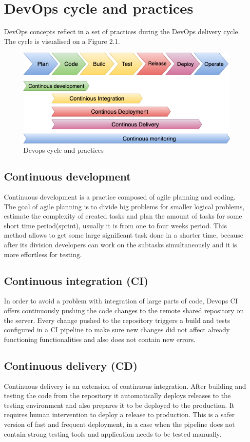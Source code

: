 \section{DevOps cycle and practices} DevOps concepts reflect in a set of practices during the DevOps delivery cycle. The cycle is visualised on a Figure 2.1. 

\begin{figure}[h]
\centering
\includegraphics[scale=0.56]{../png/devops.png}
\caption{Devops cycle and practices}\label{picture:devops}
\end{figure}

\subsection{Continuous development} Continuous development is a practice composed of agile planning and coding. The goal of agile planning  is to divide big problems for smaller logical problems, estimate the complexity of created tasks and plan the amount of tasks for some short time period(sprint), usually it is from one to four weeks period. This method allows to get some large significant task done in a shorter time, because after its division developers can work on the subtasks simultaneously and it is more effortless for testing.

\subsection{Continuous integration (CI)} In order to avoid a problem with integration of large parts of code, Devops CI offers continuously pushing the code changes to the remote shared repository on the server. Every change pushed to the repository triggers a build and tests configured in a CI pipeline to make sure new changes did not affect already functioning functionalities and also does not contain new errors.

\subsection{Continuous delivery (CD)} Continuous delivery is an extension of continuous integration. After building and testing the code from the repository it automatically deploys releases to the testing environment and also prepares it to be deployed to the production. It requires human intervention to deploy a release to production. This is a safer version of fast and frequent deployment, in a case when the pipeline does not contain strong testing tools and application needs to be tested manually.

